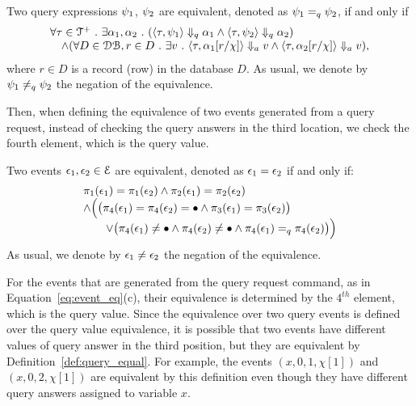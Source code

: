 {{\begin{defn}
%
\label{def:query_equal}
Two query expressions $\psi_1$, $\psi_2$ are equivalent, denoted as $\psi_1 =_{q} \psi_2$, if and only if
\[
 \begin{array}{l} 
 \forall \mathtt{\tau} \in \mathcal{T}^{+} ~.~ \exists \alpha_1, \alpha_2 
 ~.~
 (\langle \mathtt{\tau}, \psi_1 \rangle \Downarrow_q \alpha_1 \land \langle \mathtt{\tau}, \psi_2  \rangle \Downarrow_q \alpha_2) 
 \\
 \quad \land (\forall D \in \mathcal{DB}, r \in D ~.~ 
 \exists v 
 ~.~ 
 \langle \mathtt{\tau}, \alpha_1[r/\chi] \rangle \Downarrow_a v \land \langle \mathtt{\tau}, \alpha_2[r/\chi]  \rangle \Downarrow_a v), 
 \end{array}
 \]
where $r \in D$ is a record (row) in the database $D$. 
As usual, we denote by $\psi_1 \neq_{q} \psi_2$ the negation of the equivalence.
\end{defn}
%
Then, when defining the equivalence of two events generated from a query request,
instead of checking the query answers in the third location,
we check the fourth element, which is the query value.
\begin{defn}
 \label{def:event_eq}
 Two events $\mathtt{\epsilon}_1, \mathtt{\epsilon}_2 \in \mathcal{E}$ are equivalent, 
 denoted as $\mathtt{\epsilon}_1 = \mathtt{\epsilon}_2$ 
 if and only if:
 \begin{equation}
 \label{eq:event_eq}
 \begin{array}{l}
 \pi_1(\mathtt{\epsilon}_1) = \pi_1(\mathtt{\epsilon}_2) 
 \land 
 \pi_2(\mathtt{\epsilon}_1) = \pi_2(\mathtt{\epsilon}_2) 
\\
 \land 
 \Big( 
 \big(\pi_{4}(\mathtt{\epsilon}_1) = \pi_{4}(\mathtt{\epsilon}_2) = \bullet \land
 \pi_{3}(\mathtt{\epsilon}_1) = \pi_{3}(\mathtt{\epsilon}_2) \big)
 \\ \qquad 
 \lor \big(
 \pi_{4}(\mathtt{\epsilon}_1) \neq \bullet \land \pi_{4}(\mathtt{\epsilon}_2) \neq \bullet
 \land
 \pi_{4}(\mathtt{\epsilon}_1) =_q \pi_{4}(\mathtt{\epsilon}_2)\big)
 \Big)
 \end{array}
 \end{equation}
 As usual, we denote by $\mathtt{\epsilon}_1 \neq \mathtt{\epsilon}_2$ the negation of the equivalence.
\end{defn}
For the events that are generated from the query request command, as in Equation~\ref{eq:event_eq}(c),
their equivalence is determined by the $4^{th}$ element, which is the query value.
Since the equivalence over two query events is defined over the query value equivalence, 
it is possible that two events have different values of query answer in the third position, but they
are equivalent by Definition~\ref{def:query_equal}.
For example, the events $(x, 0, 1, \chi[1])$ and $(x, 0, 2, \chi[1])$ are equivalent by this definition even though they have different query answers assigned to variable $x$.

}}
